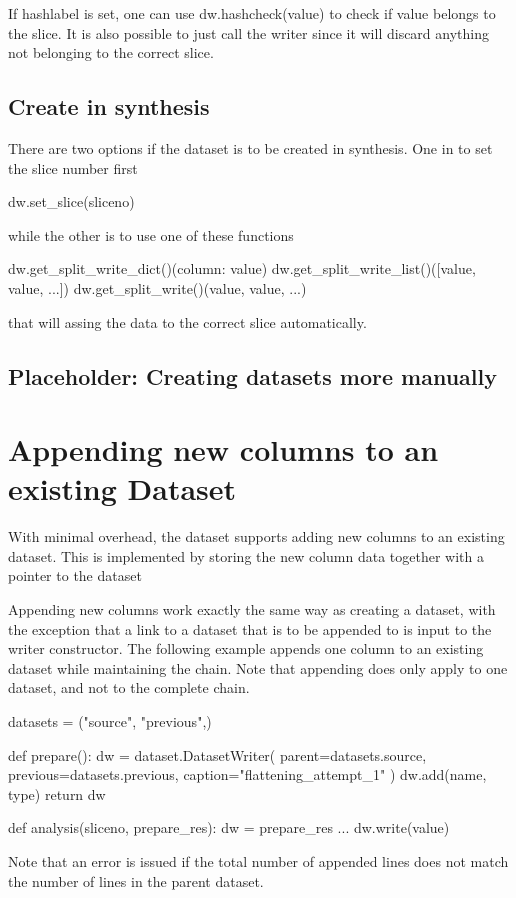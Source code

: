 If hashlabel is set, one can use dw.hashcheck(value) to check if value
belongs to the slice.  It is also possible to just call the writer
since it will discard anything not belonging to the correct slice.



\subsection{Create in synthesis}

There are two options if the dataset is to be created in synthesis.
One in to set the slice number first

\begin{python}
  dw.set_slice(sliceno)
\end{python}
while the other is to use one of these functions

\begin{python}
  dw.get_split_write_dict()({column: value})
  dw.get_split_write_list()([value, value, ...])
  dw.get_split_write()(value, value, ...)
\end{python}
that will assing the data to the correct slice automatically.

\subsection{Placeholder:  Creating datasets more manually}


\newpage
\section{Appending new columns to an existing Dataset}

With minimal overhead, the dataset supports adding new columns to an
existing dataset.  This is implemented by storing the new column data
together with a pointer to the dataset

Appending new columns work exactly the same way as creating a dataset,
with the exception that a link to a dataset that is to be appended to
is input to the writer constructor.  The following example appends one
column to an existing dataset while maintaining the chain.  Note that
appending does only apply to one dataset, and not to the complete
chain.

\begin{python}
datasets = ("source", "previous",)

def prepare():
  dw = dataset.DatasetWriter(
    parent=datasets.source,
    previous=datasets.previous,
    caption="flattening_attempt_1"
  )
  dw.add(name, type)
  return dw

def analysis(sliceno, prepare_res):
  dw = prepare_res
  ...
  dw.write(value)
\end{python}

Note that an error is issued if the total number of appended lines
does not match the number of lines in the parent dataset.

